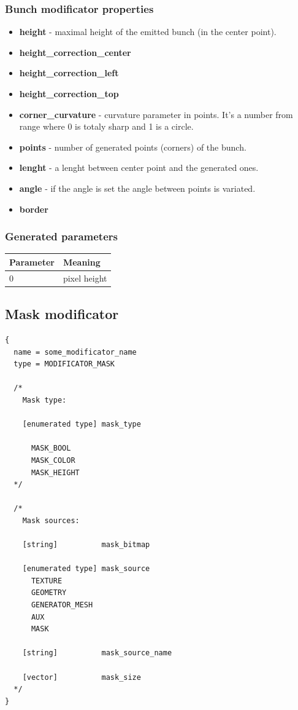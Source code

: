 \documentclass[9pt]{article}
\begin{document}
\subsubsection*{Bunch modificator properties}
\begin{itemize}
\item{\bf height} - maximal height of the emitted bunch (in the center point).
\item{\bf height\_correction\_center}
\item{\bf height\_correction\_left}
\item{\bf height\_correction\_top}
\item{\bf corner\_curvature} - curvature parameter in points. It's a number 
from \begin{math}<0,1>\end{math} range where 0 is totaly sharp and 1 is a circle.
\item{\bf points} - number of generated points (corners) of the bunch.
\item{\bf lenght} - a lenght between center point and the generated ones.
\item{\bf angle} - if the angle is set the angle between points is variated.
\item{\bf border}
\end{itemize}

\subsubsection*{Generated parameters}

\begin{center}
\begin{tabular}{|l||l|}
\hline
  Parameter & Meaning \\
\hline
\hline
  0 & pixel height \\
\hline  
\end{tabular}
\end{center}

\newpage
\subsection{Mask modificator}

\begin{verbatim}
{
  name = some_modificator_name
  type = MODIFICATOR_MASK

  /*
    Mask type:
  
    [enumerated type] mask_type
  
      MASK_BOOL
      MASK_COLOR
      MASK_HEIGHT
  */
  
  /*
    Mask sources:
  
    [string]          mask_bitmap
    
    [enumerated type] mask_source    
      TEXTURE
      GEOMETRY
      GENERATOR_MESH
      AUX
      MASK
      
    [string]          mask_source_name
    
    [vector]          mask_size
  */
}
\end{verbatim}
\end{document}
